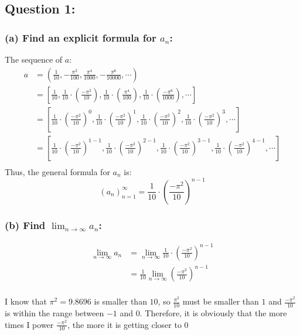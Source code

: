 \documentclass[12pt]{article}
\begin{document}
\subsection*{Question 1:}
\subsubsection*{(a) Find an explicit formula for $a_n$:}
The sequence of $a$:
\begin{align*}
    a &= \left(\frac{1}{10},-\frac{\pi^2}{100},\frac{\pi^4}{1000},-\frac{\pi^6}{10000}, \cdots \right) \\
    &= \left[\frac{1}{10},
    \frac{1}{10}\cdot \left(\frac{-\pi^2}{10} \right),
    \frac{1}{10}\cdot \left(\frac{\pi^4}{100} \right),
    \frac{1}{10}\cdot \left(\frac{-\pi^6}{1000} \right),
    \cdots \right] \\
    &=\left[
    \frac{1}{10}\cdot \left(\frac{-\pi^2}{10} \right)^0,
    \frac{1}{10}\cdot \left(\frac{-\pi^2}{10} \right)^1,
    \frac{1}{10}\cdot \left(\frac{-\pi^2}{10} \right)^2,
    \frac{1}{10}\cdot \left(\frac{-\pi^2}{10} \right)^3,
    \cdots \right] \\
    &=\left[
    \frac{1}{10}\cdot \left(\frac{-\pi^2}{10} \right)^{1-1},
    \frac{1}{10}\cdot \left(\frac{-\pi^2}{10} \right)^{2-1},
    \frac{1}{10}\cdot \left(\frac{-\pi^2}{10} \right)^{3-1},
    \frac{1}{10}\cdot \left(\frac{-\pi^2}{10} \right)^{4-1},
    \cdots \right] \\
\end{align*}
Thus, the general formula for $a_n$ is:
$$(a_n)_{n=1}^{\infty} = \frac{1}{10}\cdot \left(\frac{-\pi^2}{10} \right)^{n-1}$$


\subsubsection*{(b) Find $\displaystyle \lim_{n \rightarrow \infty} a_n$:}
\begin{align*}
    \lim_{n\to \infty} a_n &= \lim_{n\to \infty} \frac{1}{10}\cdot \left(\frac{-\pi^2}{10} \right)^{n-1} \\
    &=\frac{1}{10} \lim_{n\to \infty} \left(\frac{-\pi^2}{10} \right)^{n-1} \\
\end{align*}

\noindent I know that $\displaystyle \pi^2 = 9.8696$ is smaller than $10$, so $\displaystyle \frac{\pi^2}{10}$ must be smaller than $1$ and $\displaystyle \frac{- \pi^2}{10}$ is within the range between $-1$ and $0$. Therefore, it is obviously that the more times I power $\displaystyle \frac{- \pi^2}{10}$, the more it is getting closer to $0$
\end{document}
